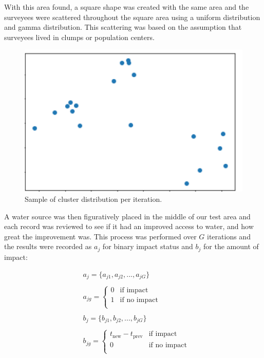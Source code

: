 With this area found, a square shape was created with the same area and the surveyees were scattered throughout the square area using a uniform distribution and gamma distribution.
This scattering was based on the assumption that surveyees lived in clumps or population centers.

\begin{figure}[h]
    \includegraphics[width=\linewidth]{figures/clusters.png}
    \caption{Sample of cluster distribution per iteration.}
    \label{fig:clusters}
\end{figure}
A water source was then figuratively placed in the middle of our test area and each record was reviewed to see if it had an improved access to water, and how great the improvement was.
This process was performed over $G$ iterations and the results were recorded as $a_j$ for binary impact status and $b_j$ for the amount of impact:

\begin{equation*}
\begin{aligned}
& a_j = \{a_{j1},a_{j2},...,a_{jG}\}\\\\
& a_{jg} =
\left\{
\begin{array}{ll}
      0 & \text{if impact}\\
      1 & \text{if no impact} \\
\end{array}
\right.\\\\
& b_j = \{b_{j1},b_{j2},...,b_{jG}\}\\\\
& b_{jg} =
\left\{
\begin{array}{ll}
      t_{\text{new}} - t_{\text{prev}} & \text{if impact} \\
      0 & \text{if no impact}\\
\end{array}
\right.
\end{aligned}
\end{equation*}

